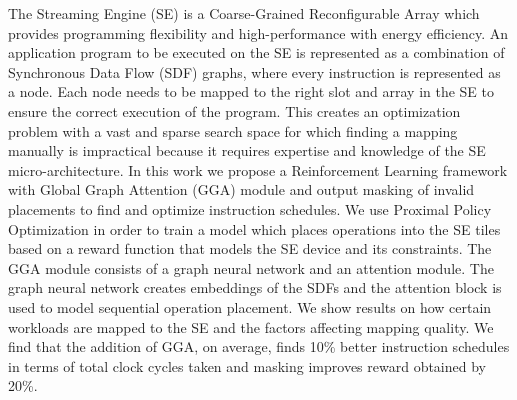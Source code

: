 The Streaming Engine (SE) is a Coarse-Grained Reconfigurable Array which provides programming flexibility and high-performance with energy efficiency.
An application program to be executed on the SE is represented as a combination of Synchronous Data Flow (SDF) graphs, where every instruction is represented as a node.
Each node needs to be mapped to the right slot and array in the SE to ensure the correct execution of the program.
This creates an optimization problem with a vast and sparse search space for which finding a mapping manually is impractical because it requires expertise and knowledge of the SE micro-architecture.
In this work we propose a Reinforcement Learning framework with Global Graph Attention (GGA) module and output masking of invalid placements to find and optimize instruction schedules.
We use Proximal Policy Optimization in order to train a model which places operations into the SE tiles based on a reward function that models the SE device and its constraints.
The GGA module consists of a graph neural network and an attention module. 
The graph neural network creates embeddings of the SDFs and the attention block is used to model sequential operation placement. 
We show results on how certain workloads are mapped to the SE and the factors affecting mapping quality.
We find that the addition of GGA, on average, finds 10\% better instruction schedules in terms of total clock cycles taken and masking improves reward obtained by 20\%.
